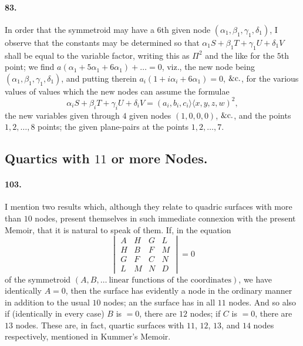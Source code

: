 \documentclass[11pt,a4paper]{article}
\providecommand{\quant}{\mathrel{\rangle\!\langle}}
\begin{document}
\bigskip


\paragraph{83.}
In order that the symmetroid may have a $6$th given node $(\alpha_1, \beta_1, \gamma_1, \delta_1)$,
I observe that the constants may be determined so that
$\alpha_1 S + \beta_1 T + \gamma_1 U + \delta_1 V$ shall be equal to the variable
factor, writing this as $\Pi^2$ and the like for the $5$th point; we find
$a (\alpha_1 + 5\alpha_1 + 6\alpha_1) + \ldots = 0$, viz., the new node being
$(\alpha_1, \beta_1, \gamma_1, \delta_1)$, and putting therein
$a_i (1 + i\alpha_i + 6\alpha_1) = 0$, $\&{\rm c}.$, for the various values of values
which the new nodes can assume the formulae
\[
\alpha_i S + \beta_i T + \gamma_i U + \delta_i V = (a_i, b_i, c_i \quant x, y, z, w)^2,
\]
the new variables given through $4$ given nodes $(1, 0, 0, 0)$, $\&{\rm c}.$, and
the points $1, 2, \ldots, 8$ points; the given plane-pairs at the points
$1, 2, \ldots, 7$.

\bigskip

\subsection*{Quartics with $11$ or more Nodes.}

\paragraph{103.}
I mention two results which, although they relate to quadric surfaces with more than
$10$ nodes, present themselves in such immediate connexion with the present Memoir,
that it is natural to speak of them. If, in the equation
\[
\begin{vmatrix} A & H & G & L \\ H & B & F & M \\ G & F & C & N \\
L & M & N & D \end{vmatrix} = 0
\]
of the symmetroid $(A, B, \ldots\ \text{linear functions of the coordinates})$, we
have identically $A = 0$, then the surface has evidently a node in the ordinary
manner in addition to the usual $10$ nodes; an the surface has in all $11$ nodes.
And so also if (identically in every case) $B$ is $= 0$, there are $12$ nodes; if
$C$ is $= 0$, there are $13$ nodes. These are, in fact, quartic surfaces with $11$,
$12$, $13$, and $14$ nodes respectively, mentioned in Kummer's Memoir.
\end{document}

